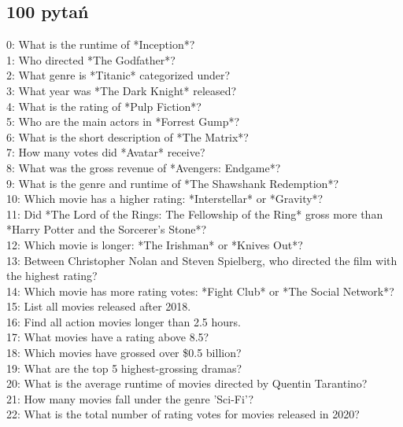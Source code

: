 \documentclass[
a4paper,
12pt,
]{article}
\begin{document}
\clearpage\newpage
\appendixpage
\begin{appendices}
\section{100 pytań}
\label{apendix:100q}

\noindent{}0: What is the runtime of *Inception*?\\
1: Who directed *The Godfather*?\\
2: What genre is *Titanic* categorized under?\\
3: What year was *The Dark Knight* released?\\
4: What is the rating of *Pulp Fiction*?\\
5: Who are the main actors in *Forrest Gump*?\\
6: What is the short description of *The Matrix*?\\
7: How many votes did *Avatar* receive?\\
8: What was the gross revenue of *Avengers: Endgame*?\\
9: What is the genre and runtime of *The Shawshank Redemption*?\\
10: Which movie has a higher rating: *Interstellar* or *Gravity*?\\
11: Did *The Lord of the Rings: The Fellowship of the Ring* gross more than *Harry Potter and the Sorcerer's Stone*?\\
12: Which movie is longer: *The Irishman* or *Knives Out*?\\
13: Between Christopher Nolan and Steven Spielberg, who directed the film with the highest rating?\\
14: Which movie has more rating votes: *Fight Club* or *The Social Network*?\\
15: List all movies released after 2018.\\
16: Find all action movies longer than 2.5 hours.\\
17: What movies have a rating above 8.5?\\
18: Which movies have grossed over \$0.5 billion?\\
19: What are the top 5 highest-grossing dramas?\\
20: What is the average runtime of movies directed by Quentin Tarantino?\\
21: How many movies fall under the genre 'Sci-Fi'?\\
22: What is the total number of rating votes for movies released in 2020?\\

\end{appendices}
\end{document}
